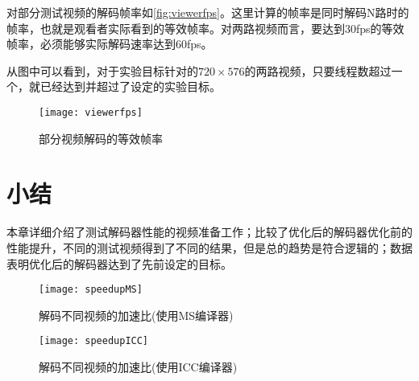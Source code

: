 对部分测试视频的解码帧率如\autoref{fig:viewerfps}。这里计算的帧率是同时解码N路时的帧率，也就是观看者实际看到的等效帧率。对两路视频而言，要达到30fps的等效帧率，必须能够实际解码速率达到60fps。

从图中可以看到，对于实验目标针对的$720\times 576$的两路视频，只要线程数超过一个，就已经达到并超过了设定的实验目标。

\begin{figure}[htbp]
\begin{center}
\texttt{[image: viewerfps]}
\caption{部分视频解码的等效帧率}
\label{fig:viewerfps}
\end{center}
\end{figure}

\section{小结}
\label{sec:sum6}

本章详细介绍了测试解码器性能的视频准备工作；比较了优化后的解码器优化前的性能提升，不同的测试视频得到了不同的结果，但是总的趋势是符合逻辑的；数据表明优化后的解码器达到了先前设定的目标。


\begin{figure}[htbp]
\begin{center}
\texttt{[image: speedupMS]}
\caption{解码不同视频的加速比(使用MS编译器)}
\label{fig:speedupMS2}
\end{center}
\end{figure}


\begin{figure}[htbp]
\begin{center}
\texttt{[image: speedupICC]}
\caption{解码不同视频的加速比(使用ICC编译器)}
\label{fig:speedupICC2}
\end{center}
\end{figure}


